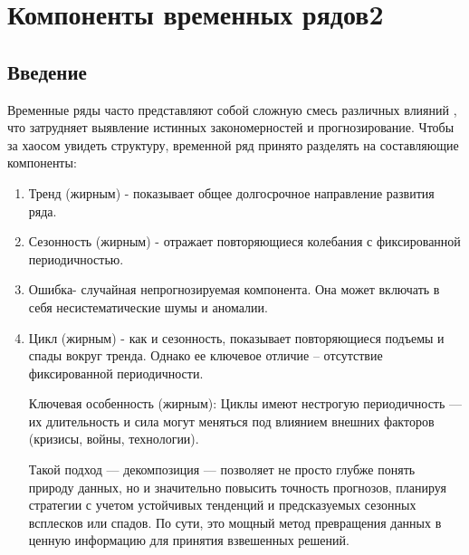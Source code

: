\chapter{Компоненты временных рядов2}
\label{chap: time_series_components2}

\section{Введение}

Временные ряды часто представляют собой сложную смесь различных влияний
, что затрудняет выявление истинных закономерностей и прогнозирование.
Чтобы за хаосом увидеть структуру, временной ряд принято разделять на
составляющие компоненты:
\begin{enumerate}
  \item Тренд (жирным) - показывает общее долгосрочное направление
    развития ряда.
  \item Сезонность (жирным) - отражает повторяющиеся колебания с
    фиксированной периодичностью.
  \item Ошибка- случайная непрогнозируемая компонента. Она может
    включать в себя несистематические шумы и аномалии.
  \item Цикл (жирным) - как и сезонность, показывает повторяющиеся
    подъемы и спады вокруг тренда.
    Однако ее ключевое отличие – отсутствие фиксированной периодичности.


    Ключевая особенность (жирным): Циклы имеют нестрогую
    периодичность — их длительность и сила могут меняться под
    влиянием внешних факторов (кризисы, войны, технологии).

    Такой подход — декомпозиция — позволяет не просто глубже понять
    природу данных, но и значительно повысить точность прогнозов,
    планируя стратегии с учетом устойчивых тенденций и предсказуемых
    сезонных всплесков или спадов.
    По сути, это мощный метод превращения данных в ценную информацию
    для принятия взвешенных решений.


\end{enumerate}
